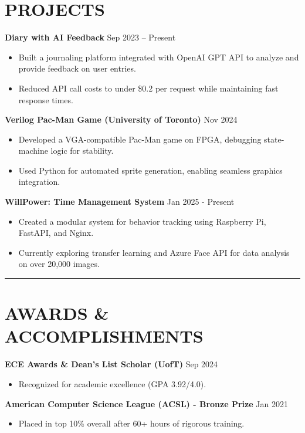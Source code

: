 \documentclass[a4paper,10pt]{article}
\begin{document}
\section*{\textbf{PROJECTS}}

\textbf{Diary with AI Feedback} \hfill Sep 2023 -- Present
\begin{itemize}[leftmargin=0.2in]
    \item Built a journaling platform integrated with OpenAI GPT API to analyze and provide feedback on user entries.
    \item Reduced API call costs to under \$0.2 per request while maintaining fast response times.
\end{itemize}

\textbf{Verilog Pac-Man Game (University of Toronto)} \hfill Nov 2024
\begin{itemize}[leftmargin=0.2in]
    \item Developed a VGA-compatible Pac-Man game on FPGA, debugging state-machine logic for stability.
    \item Used Python for automated sprite generation, enabling seamless graphics integration.
\end{itemize}

\textbf{WillPower: Time Management System} \hfill Jan 2025 - Present
\begin{itemize}[leftmargin=0.2in]
    \item Created a modular system for behavior tracking using Raspberry Pi, FastAPI, and Nginx.
    \item Currently exploring transfer learning and Azure Face API for data analysis on over 20,000 images.
\end{itemize}

\noindent\rule{\linewidth}{1pt}

\section*{\textbf{AWARDS \& ACCOMPLISHMENTS}}

\textbf{ECE Awards \& Dean's List Scholar (UofT)} \hfill Sep 2024
\begin{itemize}[leftmargin=0.2in]
    \item Recognized for academic excellence (GPA 3.92/4.0).
\end{itemize}

\textbf{American Computer Science League (ACSL) - Bronze Prize} \hfill Jan 2021
\begin{itemize}[leftmargin=0.2in]
    \item Placed in top 10\% overall after 60+ hours of rigorous training.
\end{itemize}
\end{document}
